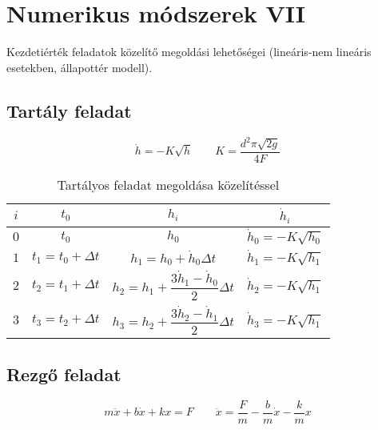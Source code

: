 \documentclass[../../main.tex]{subfiles}
\begin{document}
\section{Numerikus módszerek VII}

\begin{fulltheorem}
  Kezdetiérték feladatok közelítő megoldási lehetőségei
  (lineáris-nem lineáris esetekben, állapottér modell).
\end{fulltheorem}

\subsection{Tartály feladat}
\[
  \dot h = -K \sqrt{h}
  \qquad
  K = \frac{d^2 \pi \sqrt{2g}}{4F}
\]

\bgroup
\def\arraystretch{2}
\setlength{\arrayrulewidth}{1pt}
\begin{table}[H]
  \centering\begin{tabular}{|*{4}{c|}}
    \hline
    \rowcolor{yellow!70!gray}
    $i$ & $t_0$                  & $h_i$                                                   & $\dot h_i$
    \\ \hline
    $0$ & $t_0$                  & $h_0$                                                   & $\dot h_0 = -K \sqrt{h_0}$
    \\  \rowcolor{gray!10}
    $1$ & $t_1 = t_0 + \Delta t$ & $h_1 = h_0 + \dot h_0 \Delta t$                         & $\dot h_1 = -K \sqrt{h_1}$
    \\
    $2$ & $t_2 = t_1 + \Delta t$ & $h_2 = h_1 + \dfrac{3 \dot h_1 - \dot h_0}{2} \Delta t$ & $\dot h_2 = -K \sqrt{h_1}$
    \\  \rowcolor{gray!10}
    $3$ & $t_3 = t_2 + \Delta t$ & $h_3 = h_2 + \dfrac{3 \dot h_2 - \dot h_1}{2} \Delta t$ & $\dot h_3 = -K \sqrt{h_1}$
    \\ \hline
  \end{tabular}
  \caption{Tartályos feladat megoldása közelítéssel}
  \label{fig:int1}
\end{table}
\egroup

\subsection{Rezgő feladat}
\[
  m \ddot x + b \dot x + k x = F
  \qquad
  \ddot x = \frac{F}{m} - \frac{b}{m} \dot x - \frac{k}{m} x
\]
\end{document}
